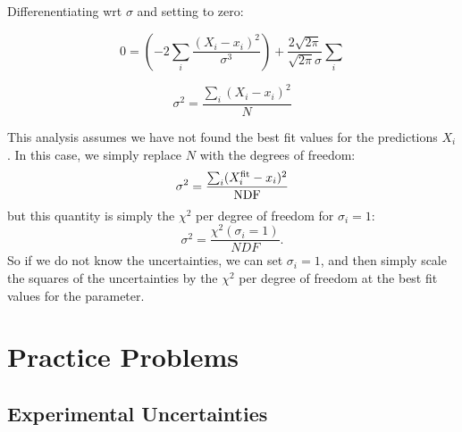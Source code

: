 \documentclass[12pt,oneside]{book}
\begin{document}
Differenentiating wrt $\sigma$ and setting to zero:

\begin{equation}
0 = \left( - 2 \sum_i \frac{(X_i-x_i)^2}{\sigma^3} \right)+\frac{2\sqrt{2\pi}}{\sqrt{2\pi}\sigma}\sum_i 
\end{equation}

\begin{equation}
\sigma^2 = \frac{\sum_i (X_i-x_i)^2}{N} 
\end{equation}

This analysis assumes we have not found the best fit values for the predictions $X_i$.  In this case, we simply replace $N$ with the degrees of freedom:
\begin{displaymath}
\sigma^2 = \frac{\sum_i (X_i^{\rm fit}-x_i)^2}{\rm NDF}
\end{displaymath}
but this quantity is simply the $\chi^2$ per degree of freedom for $\sigma_i = 1$:
\begin{displaymath}
\sigma^2 = \frac{\chi^2(\sigma_i = 1)}{NDF}.
\end{displaymath}
So if we do not know the uncertainties, we can set $\sigma_i = 1$, and then simply scale the squares of the uncertainties by the $\chi^2$ per degree of freedom at the best fit values for the parameter.  

\appendix

\chapter{Practice Problems}
\section{Experimental Uncertainties}
\end{document}
